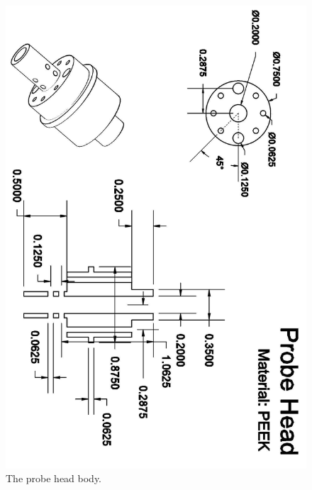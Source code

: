\documentclass[../PaulGanssle-Thesis.tex]{subfiles}
\begin{document}
\begin{figure}[p]
\centering
\includegraphics[height=0.95\textheight]{appendices/blueprints/ProbeHead.png}
\caption{The probe head body.}
\label{blueprints:ProbeHead}
\end{figure}
\end{document}
